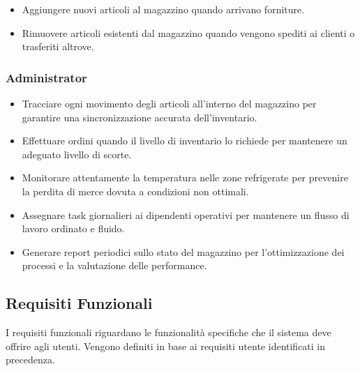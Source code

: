 \begin{itemize}
    \item Aggiungere nuovi articoli al magazzino quando arrivano forniture.
    \item Rimuovere articoli esistenti dal magazzino quando vengono spediti ai clienti o trasferiti altrove.
\end{itemize}

\subsubsection{Administrator}

\begin{itemize}
    \item Tracciare ogni movimento degli articoli all'interno del magazzino per garantire una sincronizzazione accurata dell'inventario.
    \item Effettuare ordini quando il livello di inventario lo richiede per mantenere un adeguato livello di scorte.
    \item Monitorare attentamente la temperatura nelle zone refrigerate per prevenire la perdita di merce dovuta a condizioni non ottimali.
    \item Assegnare task giornalieri ai dipendenti operativi per mantenere un flusso di lavoro ordinato e fluido.
    \item Generare report periodici sullo stato del magazzino per l'ottimizzazione dei processi e la valutazione delle performance.
\end{itemize}

\subsection{Requisiti Funzionali}

I requisiti funzionali riguardano le funzionalità specifiche che il sistema
deve offrire agli utenti. Vengono definiti in base ai requisiti utente identificati in precedenza.

